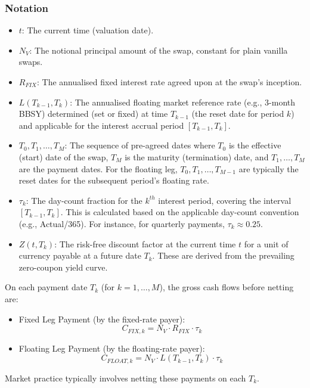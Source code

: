 \documentclass[11pt, a4paper, british]{article}
\begin{document}
\subsubsection{Notation}
\begin{itemize}
 \item $t$: The current time (valuation date).
 \item $N_V$: The notional principal amount of the swap, constant for plain vanilla swaps.
 \item $R_{FIX}$: The annualised fixed interest rate agreed upon at the swap's inception.
 \item $L(T_{k-1}, T_k)$: The annualised floating market reference rate (e.g., 3-month BBSY) determined (set or fixed) at time $T_{k-1}$ (the reset date for period $k$) and applicable for the interest accrual period $[T_{k-1}, T_k]$.
 \item $T_0, T_1, \dots, T_M$: The sequence of pre-agreed dates where $T_0$ is the effective (start) date of the swap, $T_M$ is the maturity (termination) date, and $T_1, \dots, T_M$ are the payment dates. For the floating leg, $T_0, T_1, \dots, T_{M-1}$ are typically the reset dates for the subsequent period's floating rate.
 \item $\tau_k$: The day-count fraction for the $k^{th}$ interest period, covering the interval $[T_{k-1}, T_k]$. This is calculated based on the applicable day-count convention (e.g., Actual/365). For instance, for quarterly payments, $\tau_k \approx 0.25$.
 \item $Z(t, T_k)$: The risk-free discount factor at the current time $t$ for a unit of currency payable at a future date $T_k$. These are derived from the prevailing zero-coupon yield curve.
\end{itemize}
On each payment date $T_k$ (for $k=1, \dots, M$), the gross cash flows before netting are:
\begin{itemize}
 \item Fixed Leg Payment (by the fixed-rate payer):
 \begin{equation}
 C_{FIX,k} = N_V \cdot R_{FIX} \cdot \tau_k
 \label{eq:irs_fixed_payment_final}
 \end{equation}
 \item Floating Leg Payment (by the floating-rate payer):
 \begin{equation}
 C_{FLOAT,k} = N_V \cdot L(T_{k-1}, T_k) \cdot \tau_k
 \label{eq:irs_float_payment_final}
 \end{equation}
\end{itemize}
Market practice typically involves netting these payments on each $T_k$.
\end{document}
